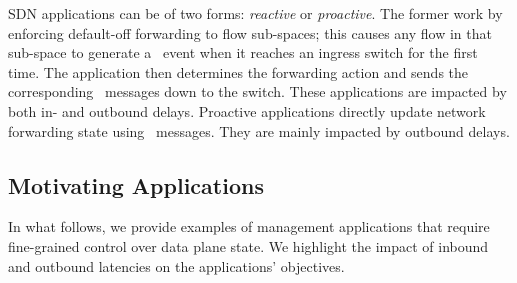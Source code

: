 

SDN applications can be of two forms: {\em
  reactive} or {\em  proactive}. The former work by enforcing default-off
forwarding to flow sub-spaces; this causes any flow in that sub-space
to generate a \packetin\ event when it reaches an ingress switch for
the first time. The application then determines the forwarding action
and sends the corresponding \flowmod\ messages down to the
switch. These applications are impacted by both in- and outbound
delays. Proactive applications directly update network
forwarding state using \flowmod\ messages. They are mainly impacted by
outbound delays.%


\subsection{Motivating Applications}

In what follows, we provide examples of management applications that
require fine-grained control over data plane state. We highlight the
impact of inbound and outbound latencies on the applications' objectives.

 


